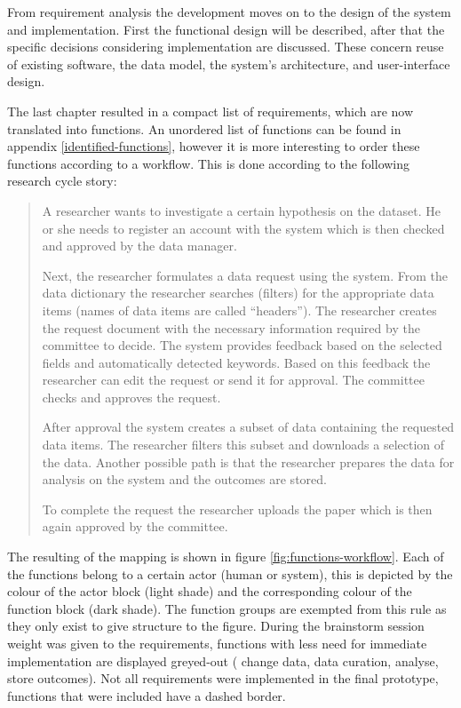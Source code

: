 
From requirement analysis the development moves on to the design of the system and implementation.
First the functional design will be described, after that the specific decisions considering implementation are discussed.
These concern reuse of existing software, the data model, the system's architecture, and user-interface design.

The last chapter resulted in a compact list of requirements, which are now translated into functions.
An unordered list of functions can be found in appendix \ref{identified-functions}, however it is more interesting to order these functions according to a workflow.
This is done according to the following research cycle story:

\begin{quotation}
	\noindent{} A researcher wants to investigate a certain hypothesis on the \project{} dataset.
	He or she needs to register an account with the system which is then checked and approved by the data manager.
	
	Next, the researcher formulates a data request using the system.
	From the data dictionary the researcher searches (filters) for the appropriate data items (names of data items are called ``headers'').
	The researcher creates the request document with the necessary information required by the committee to decide.
	The system provides feedback based on the selected fields and automatically detected keywords.
	Based on this feedback the researcher can edit the request or send it for approval.
	The committee checks and approves the request.
	
	After approval the system creates a subset of \project{} data containing the requested data items.
	The researcher filters this subset and downloads a selection of the data.
	Another possible path is that the researcher prepares the data for analysis on the system and the outcomes are stored.
	
	To complete the request the researcher uploads the paper which is then again approved by the committee.
\end{quotation}

\noindent{} The resulting of the mapping is shown in figure \ref{fig:functions-workflow}.
Each of the functions belong to a certain actor (human or system), this is depicted by the colour of the actor block (light shade) and the corresponding colour of the function block (dark shade).
The function groups are exempted from this rule as they only exist to give structure to the figure.
During the brainstorm session weight was given to the requirements, functions with less need for immediate implementation are displayed greyed-out (\ie{} change data, data curation, analyse, store outcomes).
Not all requirements were implemented in the final prototype, functions that were included have a dashed border.

